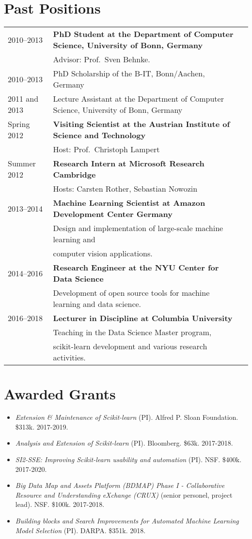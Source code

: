 \documentclass[a4paper,11pt]{article}
\begin{document}
\section{Past Positions}
\begin{tabular}{lll}

    2010--2013 & \textbf{PhD Student at the Department of Computer Science, University of Bonn, Germany}\\
         & Advisor: Prof.\ Sven Behnke. \\
    2010--2013 & PhD Scholarship of the B-IT, Bonn/Aachen, Germany\\
    2011 and 2013& Lecture Assistant at the Department of Computer Science, University of Bonn, Germany \\
    Spring 2012 & \textbf{Visiting Scientist at the Austrian Institute of Science and Technology}\\
               & Host: Prof.\ Christoph Lampert\\
    Summer 2012 & \textbf{Research Intern at Microsoft Research Cambridge}\\
               & Hosts: Carsten Rother, Sebastian Nowozin\\
    2013--2014 & \textbf{Machine Learning Scientist at Amazon Development Center Germany}\\
              & Design and implementation of large-scale machine learning and\\
              & computer vision applications.\\
    2014--2016 & \textbf{Research Engineer at the NYU Center for Data Science}\\
               & Development of open source tools for machine learning and data science.\\
    2016--2018 & \textbf{Lecturer in Discipline at Columbia University}\\
               & Teaching in the Data Science Master program, \\
               & scikit-learn development and various research activities.
\end{tabular}

\section{Awarded Grants}
\begin{itemize}
    \item \emph{Extension \& Maintenance of Scikit-learn} (PI). Alfred P. Sloan Foundation. \$313k. 2017-2019.
    \item \emph{Analysis and Extension of Scikit-learn} (PI). Bloomberg. \$63k. 2017-2018.
    \item \emph{SI2-SSE: Improving Scikit-learn usability and automation} (PI). NSF. \$400k. 2017-2020.
    \item \emph{Big Data Map and Assets Platform (BDMAP) Phase I - Collaborative Resource and Understanding eXchange (CRUX)} (senior personel, project lead). NSF. \$100k. 2017-2018.
    \item \emph{Building blocks and Search Improvements for Automated Machine Learning Model Selection} (PI). DARPA. \$351k. 2018.
\end{itemize}
\end{document}
